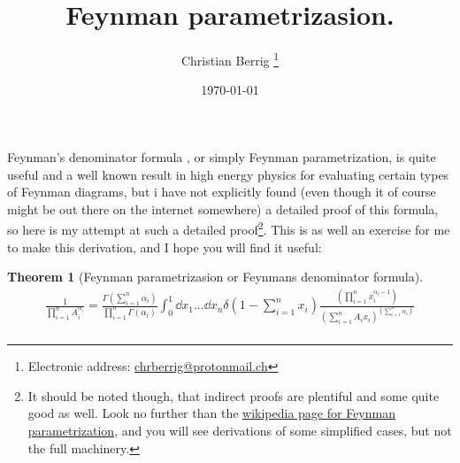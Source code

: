 \documentclass[a4paper,twoside]{article}
\title{Feynman parametrizasion.}
\author{Christian Berrig
\thanks{Electronic address: \href{mailto:chrberrig@protonmail.ch}{chrberrig@protonmail.ch}}
}
\date{\today}
\newtheorem{theorem}{Theorem}
\begin{document}
\maketitle

Feynman's denominator formula , or simply Feynman parametrization, is quite useful and a well known result in high energy physics for evaluating certain types of Feynman diagrams, but i have not explicitly found (even though it of course might be out there on the internet somewhere) a detailed proof of this formula, so here is my attempt at such a detailed proof\footnote{It should be noted though, that indirect proofs are plentiful and some quite good as well. Look no further than the \href{https://en.wikipedia.org/wiki/Feynman_parametrization}{wikipedia page for Feynman parametrization}, and you will see derivations of some simplified cases, but not the full machinery.}. This is as well an exercise for me to make this derivation, and I hope you will find it useful:

\begin{theorem}[Feynman parametrizasion or Feynmans denominator formula]
\begin{align*}
\frac{1}{\prod_{i=1}^{n}A_{i}^{\alpha_{i}}}
= \frac{\Gamma \left( \sum_{i=1}^{n} \alpha_{i} \right)}{\prod_{i=1}^{n}\Gamma(\alpha_{i})}
 \int_{0}^{1} \dd{x_{1}}...\dd{x_{n}} 
\delta \left(1 - \sum_{i=1}^{n}x_{i}\right) 
\frac{\left( \prod_{i=1}^{n} x_{i}^{\alpha_{i} - 1} \right)}{\left( \sum_{i=1}^{n}A_{i}x_{i} \right)^{\left( \sum_{i=1}^{n} \alpha_{i} \right)}} \\
\end{align*}
\end{theorem}
\end{document}
